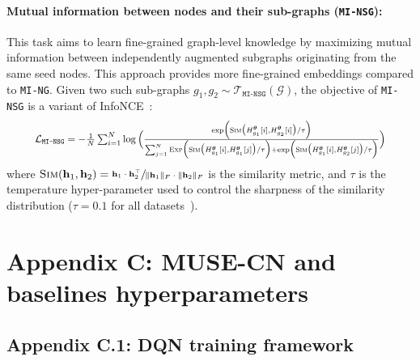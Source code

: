 \documentclass{article}
\newcommand{\ming}{\texttt{MI-NG}\xspace}
\newcommand{\minsg}{\texttt{MI-NSG}\xspace}
\begin{document}
\paragraph*{Mutual information between nodes and their sub-graphs (\minsg):}
This task aims to learn fine-grained graph-level knowledge by maximizing mutual information between independently augmented subgraphs originating from the same seed nodes. This approach provides more fine-grained embeddings compared to \ming. Given two such sub-graphs $g_1, g_2 \sim \mathcal{T}_{\minsg}(\mathcal{G})$, the objective of \minsg is a variant of InfoNCE~\citep{chen2020simple}:
\begin{equation}
\resizebox{0.9\hsize}{!}{$
\mathcal{L}_{\minsg} = -\frac{1}{N} \sum_{i=1}^{N} \log\Big(\frac{\text{exp}\Big(\textsc{Sim}\big(H_{g_1}^{\boldsymbol{\theta}}[i], H_{g_2}^{\boldsymbol{\theta}}[i]\big)/\tau\Big)}{\sum_{j=1}^{N} \textsc{Exp}\Big(\textsc{Sim}\big(H_{g_1}^{\boldsymbol{\theta}}[i], H_{g_1}^{\boldsymbol{\theta}}[j]\big)/\tau\Big) + \text{exp}\Big(\textsc{Sim}\big(H_{g_1}^{\boldsymbol{\theta}}[i], H_{g_2}^{\boldsymbol{\theta}}[j]\big)/\tau\Big)}\Big)
$}
\end{equation}
where $\textsc{Sim}(\mathbf{h}_1, \mathbf{h}_2) = \sfrac{\mathbf{h}_1\cdot\mathbf{h}_2^\top}{\lVert\mathbf{h}_1\rVert_F\cdot\lVert\mathbf{h}_2\rVert_F}$ is the similarity metric, and $\tau$ is the temperature hyper-parameter used to control the sharpness of the similarity distribution ($\tau = 0.1$ for all datasets~\cite{ju2022multi}).


\section{Appendix C: MUSE-CN and baselines hyperparameters}
\label{app:hyperparameters}

\subsection{Appendix C.1: DQN training framework}
\label{app:dqn_framework}
\end{document}
